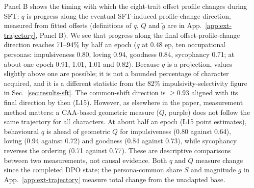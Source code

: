 \documentclass{article}
\begin{document}
Panel B shows the timing with which the eight-trait offset profile changes during SFT: $q$ is progress along the eventual SFT-induced profile-change direction, measured from fitted offsets (definitions of $q$, $Q$ and $\tilde g$ are in App.~\ref{app:ext-trajectory}, Panel B). We see that progress along the final offset-profile-change direction reaches 71--94\% by half an epoch ($q$ at 0.48 ep, ten occupational personas: impulsiveness 0.80, loving 0.94, goodness 0.84, sycophancy 0.71; at about one epoch 0.91, 1.01, 1.01 and 0.82). Because $q$ is a projection, values slightly above one are possible; it is not a bounded percentage of character acquired, and it is a different statistic from the 82\% impulsivity-selectivity figure in Sec.~\ref{sec:results-sft}. The common-shift direction is $\geq 0.93$ aligned with its final direction by then (L15). However, as elsewhere in the paper, measurement method matters: a CAA-based geometric measure ($Q$, purple) does not follow the same trajectory for all characters. At about half an epoch (L15 point estimates), behavioural $q$ is ahead of geometric $Q$ for impulsiveness (0.80 against 0.64), loving (0.94 against 0.72) and goodness (0.84 against 0.73), while sycophancy reverses the ordering (0.71 against 0.77). These are descriptive comparisons between two measurements, not causal evidence. Both $q$ and $Q$ measure change since the completed DPO state; the persona-common share $S$ and magnitude $g$ in App.~\ref{app:ext-trajectory} measure total change from the unadapted base.
\end{document}
